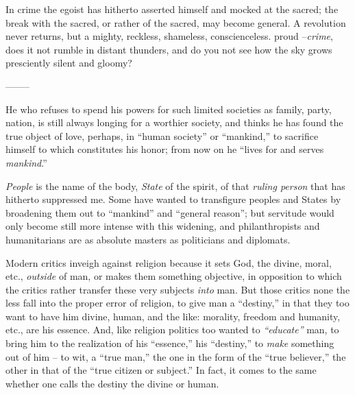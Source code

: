 In crime the egoist has hitherto asserted himself and mocked at the sacred; 
the break with the sacred, or rather of the sacred, may become general. A 
revolution never returns, but a mighty, reckless, shameless, conscienceless. 
proud --\textit{crime}, does it not rumble in distant thunders, and do you not 
see how the sky grows presciently silent and gloomy?

\begin{center}
--------\end{center}


He who refuses to spend his powers for such limited societies as family, 
party, nation, is still always longing for a worthier society, and thinks he 
has found the true object of love, perhaps, in ``human society'' or 
``mankind,'' to sacrifice himself to which constitutes his honor; from now 
on he ``lives for and serves \textit{mankind}.''

\textit{People} is the name of the body, \textit{State} of the spirit, of that 
\textit{ruling person} that has hitherto suppressed me. Some have wanted to 
transfigure peoples and States by broadening them out to ``mankind'' and 
``general reason''; but servitude would only become still more intense with 
this widening, and philanthropists and humanitarians are as absolute masters 
as politicians and diplomats.

Modern critics inveigh against religion because it sets God, the divine, 
moral, etc., \textit{outside} of man, or makes them something objective, in 
opposition to which the critics rather transfer these very subjects 
\textit{into} man. But those critics none the less fall into the proper error 
of religion, to give man a ``destiny,'' in that they too want to have him 
divine, human, and the like: morality, freedom and humanity, etc., are his 
essence. And, like religion politics too wanted to \textit{``educate''} man, 
to bring him to the realization of his ``essence,'' his ``destiny,'' to 
\textit{make} something out of him -- to wit, a ``true man,'' the one in the 
form of the ``true believer,'' the other in that of the ``true citizen or 
subject.'' In fact, it comes to the same whether one calls the destiny the 
divine or human.

